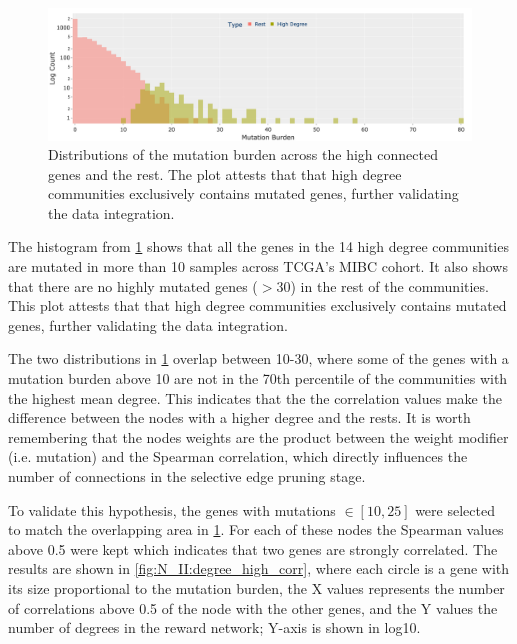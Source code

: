 \begin{figure}[!b]    
    \centering
        \includegraphics[width=1.0\textwidth,height=1.0\textheight,keepaspectratio]{Sections/Network_II/resources/reward/smallCom_MutHist.png}
        \caption[Mutation burden of the highly connected genes]{Distributions of the mutation burden across the high connected genes and the rest. The plot attests that that high degree communities exclusively contains mutated genes, further validating the data integration.}
        \label{fig:N_II:hist_molecular_highCon}
\end{figure}


The histogram from \cref{fig:N_II:hist_molecular_highCon} shows that all the genes in the 14 high degree communities are mutated in more than 10 samples across TCGA's MIBC cohort. It also shows that there are no highly mutated genes ($>$30) in the rest of the communities. This plot attests that that high degree communities exclusively contains mutated genes, further validating the data integration.

The two distributions in \cref{fig:N_II:hist_molecular_highCon} overlap between 10-30, where some of the genes with a mutation burden above 10 are not in the 70th percentile of the communities with the highest mean degree. This indicates that the the correlation values make the difference between the nodes with a higher degree and the rests. It is worth remembering that the nodes weights are the product between the weight modifier (i.e. mutation) and the Spearman correlation, which directly influences the number of connections in the selective edge pruning stage.

To validate this hypothesis, the genes with mutations $\in[10,25]$ were selected to match the overlapping area in \cref{fig:N_II:hist_molecular_highCon}. For each of these nodes the Spearman values above 0.5 were kept which indicates that two genes are strongly correlated. The results are shown in \cref{fig:N_II:degree_high_corr}, where each circle is a gene with its size proportional to the mutation burden, the X values represents the number of correlations above 0.5 of the node with the other genes, and the Y values the number of degrees in the reward network; Y-axis is shown in log10. 

